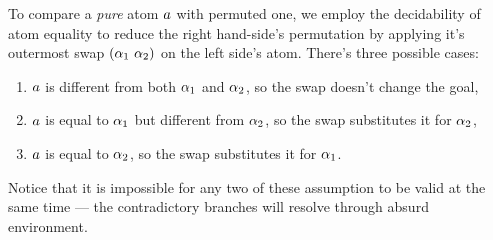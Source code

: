 \documentclass[english, mgr]{iithesis}
\renewcommand{\it}[1]{\textit{#1}}
\begin{document}
To compare a \it{pure} atom $a$ with permuted one, we employ the decidability of atom equality
to reduce the right hand-side's permutation by applying it's outermost swap $(\alpha_1\ \alpha_2)$ on the left side's atom.
There's three possible cases: \begin{enumerate}[noitemsep]
    \item $a$ is different from both $\alpha_1$ and $\alpha_2$,
so the swap doesn't change the goal,
    \item $a$ is equal to $\alpha_1$ but different from $\alpha_2$,
so the swap substitutes it for $\alpha_2$,
    \item $a$ is equal to $\alpha_2$,
so the swap substitutes it for $\alpha_1$.
\end{enumerate}
Notice that it is impossible for any two of these assumption to be valid at the same time
--- the contradictory branches will resolve through absurd environment.
\end{document}
